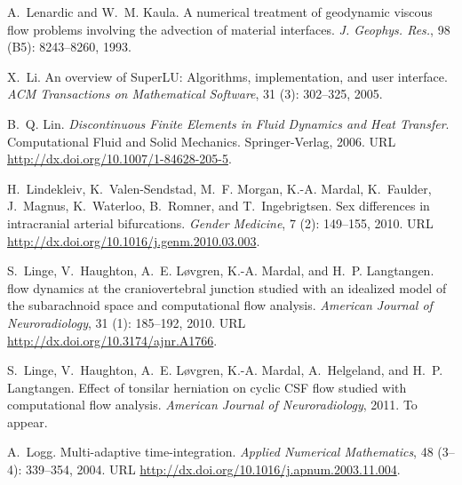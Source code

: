 \begin{thebibliography}{467}
A.~Lenardic and W.~M. Kaula.
\newblock A numerical treatment of geodynamic viscous flow problems involving
  the advection of material interfaces.
\newblock \emph{J. Geophys. Res.}, 98 (B5): 8243--8260, 1993.

X.~Li.
\newblock An overview of {SuperLU}: {A}lgorithms, implementation, and user
  interface.
\newblock \emph{ACM Transactions on Mathematical Software}, 31
  (3): 302--325, 2005.

B.~Q. Lin.
\newblock \emph{Discontinuous Finite Elements in Fluid Dynamics and Heat
  Transfer}.
\newblock Computational Fluid and Solid Mechanics. Springer-Verlag, 2006.
\newblock URL \url{http://dx.doi.org/10.1007/1-84628-205-5}.

H.~Lindekleiv, K.~Valen-Sendstad, M.~F. Morgan, K.-A. Mardal, K.~Faulder,
  J.~Magnus, K.~Waterloo, B.~Romner, and T.~Ingebrigtsen.
\newblock Sex differences in intracranial arterial bifurcations.
\newblock \emph{Gender Medicine}, 7 (2): 149--155, 2010.
\newblock URL \url{http://dx.doi.org/10.1016/j.genm.2010.03.003}.

S.~Linge, V.~Haughton, A.~E. L{\o}vgren, K.-A. Mardal, and H.~P. Langtangen.
 flow dynamics at the craniovertebral junction studied with an
  idealized model of the subarachnoid space and computational flow analysis.
\newblock \emph{American Journal of Neuroradiology}, 31 (1):
  185--192, 2010.
\newblock URL \url{http://dx.doi.org/10.3174/ajnr.A1766}.

S.~Linge, V.~Haughton, A.~E. L{\o}vgren, K.-A. Mardal, A.~Helgeland, and H.~P.
  Langtangen.
\newblock Effect of tonsilar herniation on cyclic {CSF} flow studied with
  computational flow analysis.
\newblock \emph{American Journal of Neuroradiology}, 2011.
\newblock To appear.

A.~Logg.
\newblock Multi-adaptive time-integration.
\newblock \emph{Applied Numerical Mathematics}, 48 (3--4):
  339--354, 2004.
\newblock URL \url{http://dx.doi.org/10.1016/j.apnum.2003.11.004}.


\end{thebibliography}
